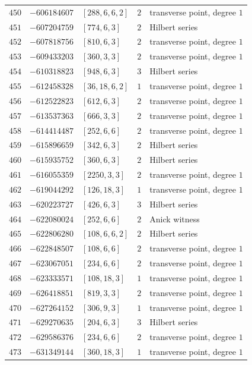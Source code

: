 \documentclass[11pt]{article}
\begin{document}
\begin{center}
\begin{longtable}{r r l c l}
$450$ & $-606184607$ & $[288,6,6,2]$ & $2$ & transverse point, degree $1$\\
$451$ & $-607204759$ & $[774,6,3]$ & $2$ & Hilbert series\\
$452$ & $-607818756$ & $[810,6,3]$ & $2$ & transverse point, degree $1$\\
$453$ & $-609433203$ & $[360,3,3]$ & $2$ & transverse point, degree $1$\\
$454$ & $-610318823$ & $[948,6,3]$ & $3$ & Hilbert series\\
$455$ & $-612458328$ & $[36,18,6,2]$ & $1$ & transverse point, degree $1$\\
$456$ & $-612522823$ & $[612,6,3]$ & $2$ & transverse point, degree $1$\\
$457$ & $-613537363$ & $[666,3,3]$ & $2$ & transverse point, degree $1$\\
$458$ & $-614414487$ & $[252,6,6]$ & $2$ & transverse point, degree $1$\\
$459$ & $-615896659$ & $[342,6,3]$ & $2$ & Hilbert series\\
$460$ & $-615935752$ & $[360,6,3]$ & $2$ & Hilbert series\\
$461$ & $-616055359$ & $[2250,3,3]$ & $2$ & transverse point, degree $1$\\
$462$ & $-619044292$ & $[126,18,3]$ & $1$ & transverse point, degree $1$\\
$463$ & $-620223727$ & $[426,6,3]$ & $3$ & Hilbert series\\
$464$ & $-622080024$ & $[252,6,6]$ & $2$ & Anick witness\\
$465$ & $-622806280$ & $[108,6,6,2]$ & $2$ & Hilbert series\\
$466$ & $-622848507$ & $[108,6,6]$ & $2$ & transverse point, degree $1$\\
$467$ & $-623067051$ & $[234,6,6]$ & $2$ & transverse point, degree $1$\\
$468$ & $-623333571$ & $[108,18,3]$ & $1$ & transverse point, degree $1$\\
$469$ & $-626418851$ & $[819,3,3]$ & $2$ & transverse point, degree $1$\\
$470$ & $-627264152$ & $[306,9,3]$ & $1$ & transverse point, degree $1$\\
$471$ & $-629270635$ & $[204,6,3]$ & $3$ & Hilbert series\\
$472$ & $-629586376$ & $[234,6,6]$ & $2$ & transverse point, degree $1$\\
$473$ & $-631349144$ & $[360,18,3]$ & $1$ & transverse point, degree $1$\\

\end{longtable}
\end{center}
\end{document}
